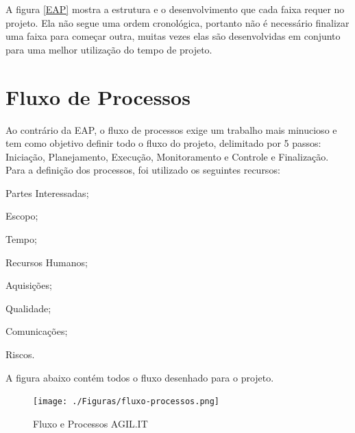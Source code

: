A figura \ref{EAP} mostra a estrutura e o desenvolvimento que cada faixa requer no projeto. Ela não segue uma ordem cronológica, portanto não é necessário finalizar uma faixa para começar outra, muitas vezes elas são desenvolvidas em conjunto para uma melhor utilização do tempo de projeto.

\section{Fluxo de Processos}
Ao contrário da EAP, o fluxo de processos exige um trabalho mais minucioso e tem como objetivo definir todo o fluxo do projeto, delimitado por 5 passos: Iniciação, Planejamento, Execução, Monitoramento e Controle e Finalização.
Para a definição dos processos, foi utilizado os seguintes recursos:

\begin{subalineas}
	\item {Partes Interessadas};
	\item {Escopo};
	\item {Tempo};
	\item {Recursos Humanos};
	\item {Aquisições};
	\item {Qualidade};
	\item {Comunicações};
	\item {Riscos}.
\end{subalineas}

A figura abaixo contém todos o fluxo desenhado para o projeto.

\newpage
\begin{figure}[htb]
	\caption{\label{Fluxo-Processos}Fluxo e Processos AGIL.IT}
	\begin{center}
		\texttt{[image: ./Figuras/fluxo-processos.png]}
	\end{center}
\end{figure}

